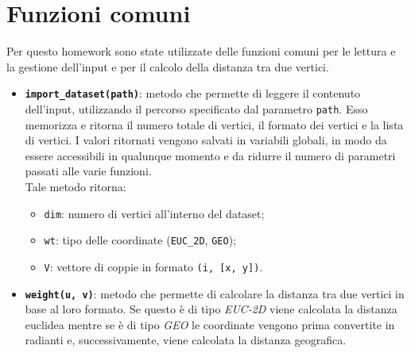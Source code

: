 \section{Funzioni comuni}
Per questo homework sono state utilizzate delle funzioni comuni per le lettura e la gestione dell'input e per il calcolo della distanza tra due vertici.

\begin{itemize}
	\item \texttt{\textbf{import\_dataset(path)}}: metodo che permette di leggere il contenuto dell'input, utilizzando il percorso specificato dal parametro \texttt{path}. Esso memorizza e ritorna il numero totale di vertici, il formato dei vertici e la lista di vertici. I valori ritornati vengono salvati in variabili globali, in modo da essere accessibili in qualunque momento e da ridurre il numero di parametri passati alle varie funzioni.\\
	Tale metodo ritorna:
	\begin{itemize}
		\item \texttt{dim}: numero di vertici all'interno del dataset;
		\item \texttt{wt}: tipo delle coordinate (\texttt{EUC\_2D}, \texttt{GEO});
		\item \texttt{V}: vettore di coppie in formato \texttt{(i, [x, y])}.
	\end{itemize}
	\item \texttt{\textbf{weight(u, v)}}: metodo che permette di calcolare la distanza tra due vertici in base al loro formato. Se questo è di tipo \emph{EUC-2D} viene calcolata la distanza euclidea mentre se è di tipo \emph{GEO} le coordinate vengono prima convertite in radianti e, successivamente, viene calcolata la distanza geografica. 
\end{itemize}

\pagebreak
